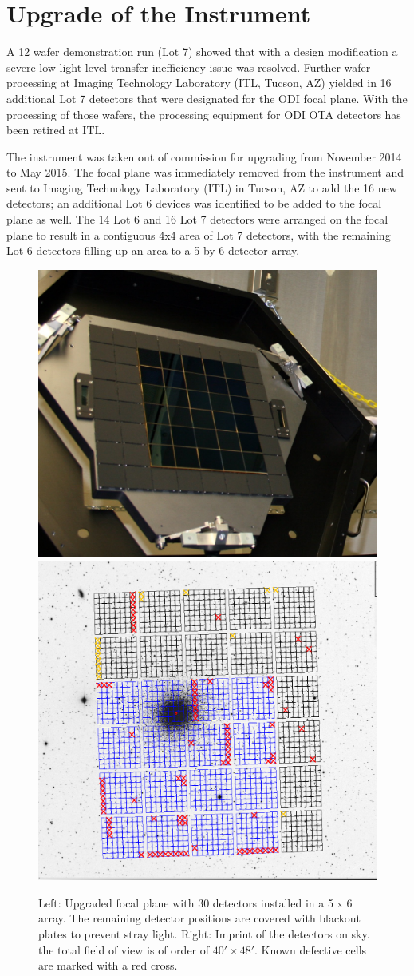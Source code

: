\documentclass[]{spieman}
\begin{document}
\section{Upgrade of the Instrument} 

A 12 wafer demonstration run (Lot 7) showed that with a design modification a 
severe low light level transfer inefficiency issue was 
resolved\cite{harbeck2014}.  Further wafer processing at Imaging Technology 
Laboratory (ITL, Tucson, AZ) yielded in 16 additional Lot 7 detectors that were 
designated for the ODI focal plane. With the processing of those wafers, the 
processing equipment for ODI OTA detectors has been retired at ITL. 

The instrument was taken out of commission for upgrading from November 2014 to 
May 2015. The focal plane was immediately removed from the instrument and sent 
to  Imaging Technology Laboratory  (ITL) in Tucson, AZ to add the 16 new 
detectors; an additional Lot 6 devices was identified to be added to the focal 
plane as well. The 14 Lot 6 and 16 Lot 7 detectors were arranged on the focal 
plane to result in a contiguous 4x4 area of Lot 7 detectors, with the remaining 
Lot 6 detectors filling up an area to a 5 by 6 detector array.


\begin{figure}
	\centering
	\hfill
	\includegraphics[height=0.4\textwidth]{images/detectorsOnFocalPlane5x6.jpg}
	\hfill
	\includegraphics[height=0.4\textwidth]{images/5ODI_Imprint.png}
	\hfill \\[1ex]
	
	\caption{\label{fig_focalplane} Left: Upgraded focal plane with 30 
	detectors installed in a 5 x 6 array. The remaining detector positions are 
	covered with blackout plates to prevent stray light. Right: Imprint of the 
	detectors on sky. the total field of view is of order of $40'\times 48'$. 
	Known defective cells are marked with a red cross. }
\end{figure}
\end{document}
